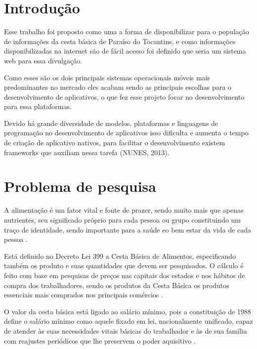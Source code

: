 \documentclass{ifto-tex}
\begin{document}
\textual

\chapter{Introdução}

	Esse trabalho foi proposto como uma a forma de disponibilizar para o população de informações da cesta básica de Paraíso do Tocantins, e como informações disponibilizadas na internet são de fácil acesso foi definido que seria um sistema web para essa divulgação.
	
	
	Como esses são os dois principais sistemas operacionais móveis mais predominantes no mercado eles acabam sendo as principais escolhas para o desenvolvimento de aplicativos, o que fez esse projeto focar no desenvolvimento para essa plataformas. 
	
	Devido há grande diversidade de modelos, plataformas e linguagens de programação no desenvolvimento de aplicativos isso dificulta e aumenta o tempo de criação de aplicativo nativos, para facilitar o desenvolvimento existem frameworks que auxiliam nessa tarefa (NUNES, 2013).
	
	

\chapter{Problema de pesquisa}
	
		A alimentação é um fator vital e fonte de prazer, sendo muito mais que apenas nutrientes, seu significado próprio para cada pessoa ou grupo constituindo um traço de identidade, sendo importante para a saúde eo bem estar da vida de cada pessoa \cite{loureiro2004importancia}.
		
		Está definido no Decreto Lei 399 a Cesta Básica de Alimentos, especificando também os produto e suas quantidades que devem ser pesquisados. O cálculo é feito com base em pesquisas de preços nas capitais dos estados e nos hábitos de compra dos trabalhadores, sendo os produtos da Cesta Básica os produtos essenciais mais comprados nos principais comércios \cite{metodolo8:online}.
		
		O valor da cesta básica está ligado ao salário mínimo, pois a constituição de 1988 define o salário mínimo como aquele fixado em lei, nacionalmente unificado, capaz de atender às suas necessidades vitais básicas do trabalhador e às de sua família com reajustes periódicos que lhe preservem o poder aquisitivo \cite{metodolo8:online}.
		
\end{document}
